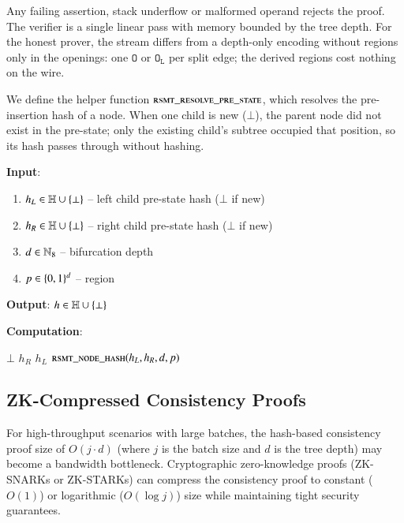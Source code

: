 Any failing assertion, stack underflow or malformed operand rejects the proof. The verifier is a single linear pass with memory bounded by the tree depth. For the honest prover, the stream differs from a depth-only encoding without regions only in the openings: one $\mathtt{O}$ or $\mathtt{O_L}$ per split edge; the derived regions cost nothing on the wire.

We define the helper function $\textsc{rsmt\_resolve\_pre\_state}$, which resolves the pre-insertion hash of a node. When one child is new ($\bot$), the parent node did not exist in the pre-state; only the existing child's subtree occupied that position, so its hash passes through without hashing.


\textbf{Input}:
\begin{enumerate}
	\item $h_L \in \mathbb{H} \cup\{\bot\}$ -- left child pre-state hash ($\bot$ if new)
	\item $h_R \in \mathbb{H} \cup\{\bot\}$ -- right child pre-state hash ($\bot$ if new)
	\item $d \in \mathbb{N}_{8}$ -- bifurcation depth
	\item $p \in \{0,1\}^{d}$ -- region
\end{enumerate}

\textbf{Output}: $h \in \mathbb{H} \cup\{\bot\}$

\textbf{Computation}:
\begin{algorithmic}
			\State \Return $\bot$ 
			\State \Return $h_R$ 
			\State \Return $h_L$ 
		\Else
			\State \Return $\Call{rsmt\_node\_hash}{h_L, h_R, d, p}$ 
		\EndIf
	\EndFunction
\end{algorithmic}


\subsection{ZK-Compressed Consistency Proofs}\label{app:zk-consistency-proof}

For high-throughput scenarios with large batches, the hash-based consistency proof size of $O(j \cdot d)$ (where $j$ is the batch size and $d$ is the tree depth) may become a bandwidth bottleneck. Cryptographic zero-knowledge proofs (ZK-SNARKs or ZK-STARKs) can compress the consistency proof to constant ($O(1)$) or logarithmic ($O(\log j)$) size while maintaining tight security guarantees.

